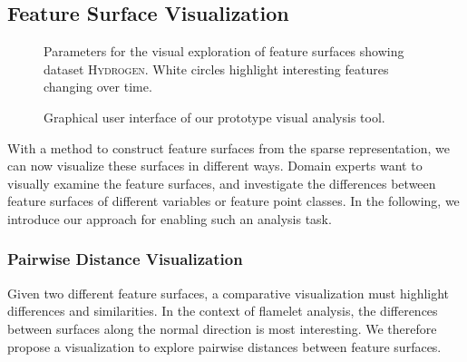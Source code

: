 \subsection{Feature Surface Visualization}
%
\begin{figure}[p]
    \centering
    \setlength\figurewidth\textwidth
    
    \caption{Parameters for the visual exploration of feature surfaces showing
    	dataset \textsc{Hydrogen}. White circles highlight interesting features
    	changing over time.
    }
    \label{fig_contourmeshvis}
\end{figure}
%
\begin{figure}[t]
	\begin{captionbeside}{Graphical user interface of our prototype visual
	analysis tool.
		\label{fig:gui}}
		\setlength{}
		
	\end{captionbeside}
\end{figure}
%
With a method to construct feature surfaces from the sparse representation, we
can now visualize these surfaces in different ways.
%
Domain experts want to visually examine the feature surfaces, and investigate
the differences between feature surfaces of different variables or feature point
classes.
%
In the following, we introduce our approach for enabling such an analysis task.
%
%
\subsubsection{Pairwise Distance Visualization}
%
Given two different feature surfaces, a comparative visualization must highlight
differences and similarities.
%
In the context of flamelet analysis, the differences between surfaces along
the normal direction is most interesting.
%
We therefore propose a visualization to explore pairwise distances between
feature surfaces.
%

